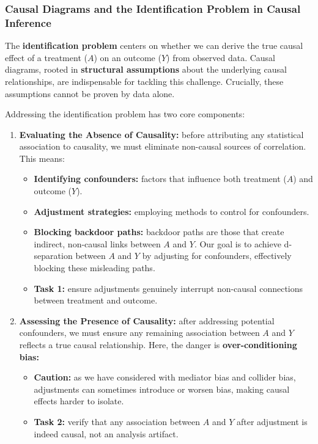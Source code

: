 \documentclass[
  singlecolumn]{article}
\providecommand{\tightlist}{%
  \setlength{\itemsep}{0pt}\setlength{\parskip}{0pt}}\usepackage{longtable,booktabs,array}
\begin{document}
\subsubsection{Causal Diagrams and the Identification Problem in Causal
Inference}\label{causal-diagrams-and-the-identification-problem-in-causal-inference}

The \textbf{identification problem} centers on whether we can derive the
true causal effect of a treatment (\(A\)) on an outcome (\(Y\)) from
observed data. Causal diagrams, rooted in \textbf{structural
assumptions} about the underlying causal relationships, are
indispensable for tackling this challenge. Crucially, these assumptions
cannot be proven by data alone.

Addressing the identification problem has two core components:

\begin{enumerate}
\def\labelenumi{\arabic{enumi}.}
\tightlist
\item
  \textbf{Evaluating the Absence of Causality:} before attributing any
  statistical association to causality, we must eliminate non-causal
  sources of correlation. This means:

  \begin{itemize}
  \tightlist
  \item
    \textbf{Identifying confounders:} factors that influence both
    treatment (\(A\)) and outcome (\(Y\)).
  \item
    \textbf{Adjustment strategies:} employing methods to control for
    confounders.
  \item
    \textbf{Blocking backdoor paths:} backdoor paths are those that
    create indirect, non-causal links between \(A\) and \(Y\). Our goal
    is to achieve d-separation between \(A\) and \(Y\) by adjusting for
    confounders, effectively blocking these misleading paths.
  \item
    \textbf{Task 1:} ensure adjustments genuinely interrupt non-causal
    connections between treatment and outcome.
  \end{itemize}
\item
  \textbf{Assessing the Presence of Causality:} after addressing
  potential confounders, we must ensure any remaining association
  between \(A\) and \(Y\) reflects a true causal relationship. Here, the
  danger is \textbf{over-conditioning bias:}

  \begin{itemize}
  \tightlist
  \item
    \textbf{Caution:} as we have considered with mediator bias and
    collider bias, adjustments can sometimes introduce or worsen bias,
    making causal effects harder to isolate.
  \item
    \textbf{Task 2:} verify that any association between \(A\) and \(Y\)
    after adjustment is indeed causal, not an analysis artifact.
  \end{itemize}
\end{enumerate}
\end{document}
